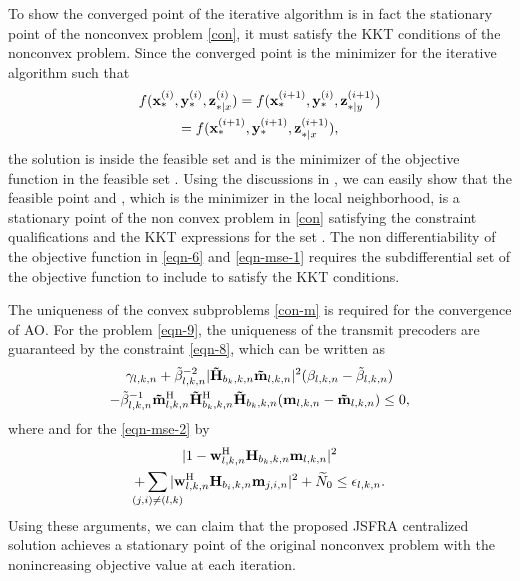 To show the converged point of the iterative algorithm is in fact the stationary point of the nonconvex problem \eqref{con}, it must satisfy the \ac{KKT} conditions of the nonconvex problem. Since the converged point is the minimizer for the iterative algorithm such that 
\begin{multline} \label{con-opt}
f(\iter{\mx}{\ast}{i},\iter{\my}{\ast}{i},\iter{\mz}{\ast|x}{i}) = f(\iter{\mx}{\ast}{i+1},\iter{\my}{\ast}{i},\iter{\mz}{\ast|y}{i+1}) \\ = 
f(\iter{\mx}{\ast}{i+1},\iter{\my}{\ast}{i+1},\iter{\mz}{\ast|x}{i+1}),
\end{multline}
the solution is inside the feasible set  and  is the minimizer of the objective function  in the feasible set . Using the discussions in \cite{marks1978technical}, we can easily show that the feasible point  and , which is the minimizer in the local neighborhood, is a stationary point of the non convex problem in \eqref{con} satisfying the constraint qualifications and the \ac{KKT} expressions for the set . The non differentiability of the objective function in \eqref{eqn-6} and \eqref{eqn-mse-1} requires the subdifferential set of the objective function to include  to satisfy the \ac{KKT} conditions.

The uniqueness of the convex subproblems \eqref{con-m} is required for the convergence of \ac{AO}. For the problem \eqref{eqn-9}, the uniqueness of the transmit precoders are guaranteed by the constraint \eqref{eqn-8}, which can be written as
\begin{multline}
\gamma_{l,k,n} + \tilde{\beta}_{l,k,n}^{-2} |\mathbf{\tilde{H}}_{b_k,k,n} \mathbf{\tilde{m}}_{l,k,n}|^2 (\beta_{l,k,n} - \tilde{\beta}_{l,k,n}) \\
- \tilde{\beta}_{l,k,n}^{-1} \mathbf{\tilde{m}}_{l,k,n}^{\mathrm{H}} \mathbf{\tilde{H}}_{b_k,k,n}^{\mathrm{H}} \mathbf{\tilde{H}}_{b_k,k,n} (\mathbf{m}_{l,k,n} - \mathbf{\tilde{m}}_{l,k,n}) \leq 0,
\end{multline}
where  and for the \eqref{eqn-mse-2} by
\begin{multline}
| 1 - \mvec{w}{l,k,n}^\herm \mvec{H}{b_k,k,n} \mvec{m}{l,k,n} |^2 \\ + \sum_{\mathclap{(j,i) \neq (l,k)}} | \mvec{w}{l,k,n}^\herm \mvec{H}{b_i,k,n} \mvec{m}{j,i,n} |^2 + \enoise \leq \epsilon_{l,k,n}.
\end{multline}
Using these arguments, we can claim that the proposed \ac{JSFRA} centralized solution achieves a stationary point of the original nonconvex problem with the nonincreasing objective value at each iteration. 










